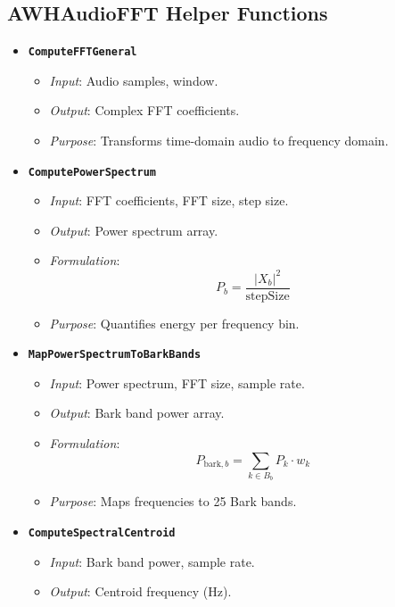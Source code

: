\documentclass[11pt]{article}
\begin{document}
\subsection{AWHAudioFFT Helper Functions}
\begin{itemize}[label=$\bullet$]
  \item \textbf{\texttt{ComputeFFTGeneral}}
    \begin{itemize}
      \item \textit{Input}: Audio samples, window.
      \item \textit{Output}: Complex FFT coefficients.
      \item \textit{Purpose}: Transforms time-domain audio to frequency domain.
    \end{itemize}
  \item \textbf{\texttt{ComputePowerSpectrum}}
    \begin{itemize}
      \item \textit{Input}: FFT coefficients, FFT size, step size.
      \item \textit{Output}: Power spectrum array.
      \item \textit{Formulation}:
        \begin{equation}
        P_b = \frac{|X_b|^2}{\text{stepSize}}
        \end{equation}
      \item \textit{Purpose}: Quantifies energy per frequency bin.
    \end{itemize}
  \item \textbf{\texttt{MapPowerSpectrumToBarkBands}}
    \begin{itemize}
      \item \textit{Input}: Power spectrum, FFT size, sample rate.
      \item \textit{Output}: Bark band power array.
      \item \textit{Formulation}:
        \begin{equation}
        P_{\text{bark},b} = \sum_{k \in B_b} P_k \cdot w_k
        \end{equation}
      \item \textit{Purpose}: Maps frequencies to 25 Bark bands.
    \end{itemize}
  \item \textbf{\texttt{ComputeSpectralCentroid}}
    \begin{itemize}
      \item \textit{Input}: Bark band power, sample rate.
      \item \textit{Output}: Centroid frequency (Hz).

\end{itemize}
\end{itemize}
\end{document}
